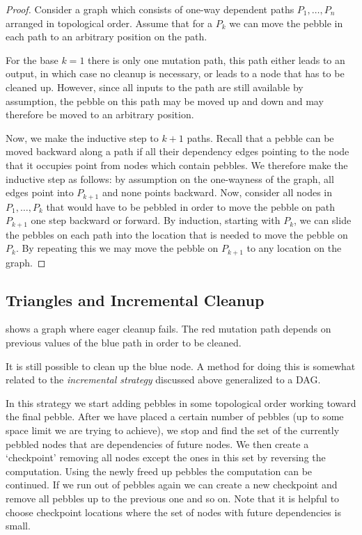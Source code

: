 
\begin{proof} Consider a graph which consists of one-way dependent paths
$P_1,\dotsc,P_n$ arranged in topological order. Assume that for a $P_k$ we
can move the pebble in each path to an arbitrary position on the path.

For the base $k=1$ there is only one mutation path, this path either leads to
an output, in which case no cleanup is necessary, or leads to a node that has
to be cleaned up. However, since all inputs to the path are still available by
assumption, the pebble on this path may be moved up and down and may therefore
be moved to an arbitrary position.

Now, we make the inductive step to $k+1$ paths. Recall that a pebble can be
moved backward along a path if all their dependency edges pointing to the node
that it occupies point from nodes which contain pebbles. We therefore make the
inductive step as follows: by assumption on the one-wayness of the graph, all
edges point into $P_{k+1}$ and none points backward. Now, consider all nodes in
$P_1, \ldots, P_k$ that would have to be pebbled in order to move the pebble on
path $P_{k+1}$ one step backward or forward. By induction, starting with $P_k$,
we can slide the pebbles on each path into the location that is needed to move
the pebble on $P_k$. By repeating this we may move the pebble on $P_{k+1}$ to
any location on the graph.\end{proof}

\subsection{Triangles and Incremental Cleanup}

 shows a graph where eager cleanup fails. The red mutation
path depends on previous values of the blue path in order to be cleaned.

It is still possible to clean up the blue node. A method for doing this is
somewhat related to the \emph{incremental strategy} discussed above generalized
to a DAG.

In this strategy we start adding pebbles in some topological order working
toward the final pebble. After we have placed a certain number of pebbles (up
to some space limit we are trying to achieve), we stop and find the set of the
currently pebbled nodes that are dependencies of future nodes. We then create a
`checkpoint' removing all nodes except the ones in this set by reversing the
computation.  Using the newly freed up pebbles the computation can be
continued.  If we run out of pebbles again we can create a new checkpoint and
remove all pebbles up to the previous one and so on. Note that it is helpful to
choose checkpoint locations where the set of nodes with future dependencies is
small.

